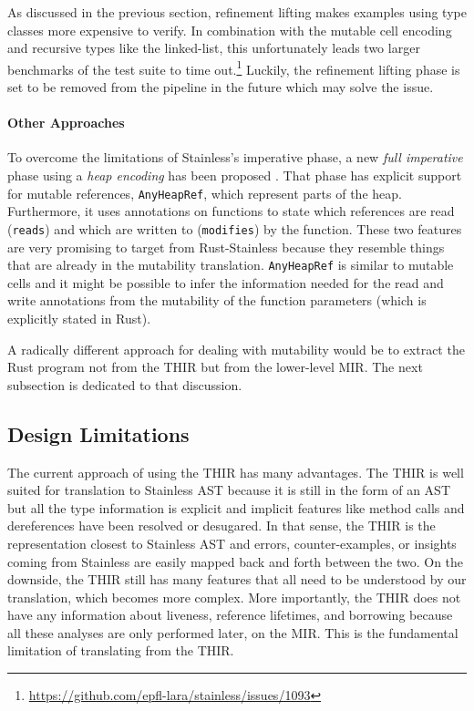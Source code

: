 As discussed in the previous section, refinement lifting makes examples using
type classes more expensive to verify. In combination with the mutable cell
encoding and recursive types like the linked-list, this unfortunately leads two
larger benchmarks of the test suite to time
out.\footnote{\url{https://github.com/epfl-lara/stainless/issues/1093}} Luckily,
the refinement lifting phase is set to be removed from the pipeline in the
future which may solve the issue.

\paragraph{Other Approaches}

To overcome the limitations of Stainless's imperative phase, a new \emph{full
imperative} phase using a \emph{heap encoding} has been proposed
\cite{new-imperative}. That phase has explicit support for mutable references,
\lstinline!AnyHeapRef!, which represent parts of the heap. Furthermore, it uses
annotations on functions to state which references are read (\lstinline!reads!)
and which are written to (\lstinline!modifies!) by the function. These two
features are very promising to target from Rust-Stainless because they resemble
things that are already in the mutability translation. \lstinline!AnyHeapRef! is
similar to mutable cells and it might be possible to infer the information
needed for the read and write annotations from the mutability of the function
parameters (which is explicitly stated in Rust).

A radically different approach for dealing with mutability would be to extract
the Rust program not from the THIR but from the lower-level MIR. The next
subsection is dedicated to that discussion.

\subsection{Design Limitations}
\label{mir-thir}

The current approach of using the THIR has many advantages. The THIR is well
suited for translation to Stainless AST because it is still in the form of an
AST but all the type information is explicit and implicit features like method
calls and dereferences have been resolved or desugared. In that sense, the THIR
is the representation closest to Stainless AST and errors, counter-examples, or
insights coming from Stainless are easily mapped back and forth between the two.
On the downside, the THIR still has many features that all need to be understood
by our translation, which becomes more complex. More importantly, the THIR does
not have any information about liveness, reference lifetimes, and borrowing
because all these analyses are only performed later, on the MIR. This is the
fundamental limitation of translating from the THIR.

